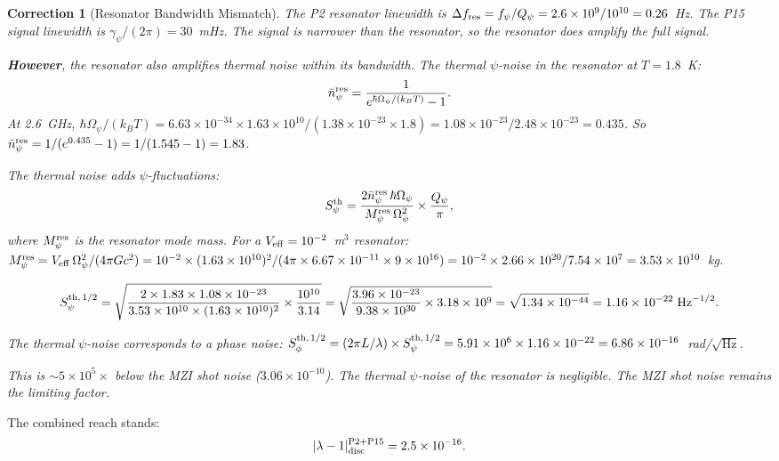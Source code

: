 \documentclass[11pt]{article}
\newtheorem{correction}{Correction}
\newcommand{\ee}[1]{\times 10^{#1}}
\newcommand{\lam}{\lambda}
\newcommand{\Opsi}{\Omega_\psi}
\newcommand{\gpsi}{\gamma_\psi}
\newcommand{\Mpsi}{M_\psi}
\begin{document}
\begin{correction}[Resonator Bandwidth Mismatch]
\label{corr:bandwidth}
The P2 resonator linewidth is $\Delta f_{\rm res}
= f_\psi/Q_\psi = 2.6\ee{9}/10^{10} = 0.26$~Hz. The
P15 signal linewidth is $\gpsi/(2\pi) = 30$~mHz. The signal
is narrower than the resonator, so the resonator does amplify
the full signal.

\textbf{However}, the resonator also amplifies thermal noise
within its bandwidth. The thermal $\psi$-noise in the resonator
at $T = 1.8$~K:
\begin{equation}
\bar{n}_\psi^{\rm res} = \frac{1}{e^{\hbar\Opsi/(k_BT)} - 1}.
\end{equation}
At 2.6~GHz, $\hbar\Opsi/(k_BT) = 6.63\ee{-34} \times 1.63\ee{10}
/(1.38\ee{-23} \times 1.8) = 1.08\ee{-23}/2.48\ee{-23} = 0.435$.
So $\bar{n}_\psi^{\rm res} = 1/(e^{0.435} - 1) = 1/(1.545 - 1)
= 1.83$.

The thermal noise adds $\psi$-fluctuations:
\begin{equation}
S_\psi^{\rm th} = \frac{2\bar{n}_\psi^{\rm res}\,\hbar\Opsi}
{\Mpsi^{\rm res}\,\Opsi^2}
\times \frac{Q_\psi}{\pi},
\end{equation}
where $\Mpsi^{\rm res}$ is the resonator mode mass. For a
$V_{\rm eff} = 10^{-2}$~m$^3$ resonator:
$\Mpsi^{\rm res} = V_{\rm eff}\,\Opsi^2/(4\pi G c^2)
= 10^{-2} \times (1.63\ee{10})^2/(4\pi \times 6.67\ee{-11}
\times 9\ee{16}) = 10^{-2} \times 2.66\ee{20}/7.54\ee{7}
= 3.53\ee{10}$~kg.

\begin{equation}
S_\psi^{\rm th,\,1/2} = \sqrt{\frac{2 \times 1.83 \times 1.08\ee{-23}}
{3.53\ee{10} \times (1.63\ee{10})^2} \times \frac{10^{10}}{3.14}}
= \sqrt{\frac{3.96\ee{-23}}{9.38\ee{30}} \times 3.18\ee{9}}
= \sqrt{1.34\ee{-44}} = 1.16\ee{-22}\;\text{Hz}^{-1/2}.
\end{equation}

The thermal $\psi$-noise corresponds to a phase noise:
$S_\phi^{\rm th,\,1/2} = (2\pi L/\lambda) \times S_\psi^{\rm th,\,1/2}
= 5.91\ee{6} \times 1.16\ee{-22} = 6.86\ee{-16}$~rad/$\sqrt{\text{Hz}}$.

This is $\sim 5\ee{5}\times$ below the MZI shot noise
($3.06\ee{-10}$). The thermal $\psi$-noise of the resonator
is negligible. The MZI shot noise remains the limiting factor.
\end{correction}

The combined reach stands:
\begin{equation}
|\lam-1|_{\rm disc}^{\rm P2+P15} = 2.5\ee{-16}.
\end{equation}
\end{document}
